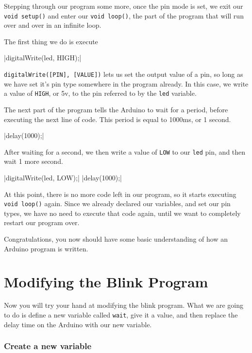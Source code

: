 \documentclass[11pt,a4paper]{article}
\begin{document}
Stepping through our program some more, once the pin mode is set, we exit our \texttt{void setup()} and enter our \texttt{void loop()}, the part of the program that will run over and over in an infinite loop. 

The first thing we do is execute 

|digitalWrite(led, HIGH);|

\texttt{digitalWrite([PIN], [VALUE])} lets us set the output value of a pin, so long as we have set it's pin type somewhere in the program already.  In this case, we write a value of \texttt{HIGH}, or 5v, to the pin referred to by the \texttt{led} variable.

The next part of the program tells the Arduino to wait for a period, before executing the next line of code.  This period is equal to 1000ms, or 1 second.

|delay(1000);|

After waiting for a second, we then write a value of \texttt{LOW} to our \texttt{led} pin, and then wait 1 more second.

|digitalWrite(led, LOW);|
|delay(1000);|

At this point, there is no more code left in our program, so it starts executing \texttt{void loop()} again.  Since we already declared our variables, and set our pin types, we have no need to execute that code again, until we want to completely restart our program over.


Congratulations, you now should have some basic understanding of how an Arduino program is written.


\section{Modifying the Blink Program} %
\label{sub:modifying_the_blink_program}

Now you will try your hand at modifying the blink program.  What we are going to do is define a new variable called \texttt{wait}, give it a value, and then replace the delay time on the Arduino with our new variable. 

\subsubsection{Create a new variable} %
\label{ssub:create_a_new_variable}
\end{document}
